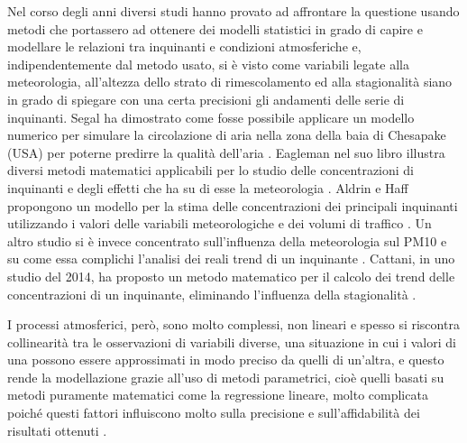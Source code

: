 \documentclass[a4paper]{report}
\begin{document}
Nel corso degli anni diversi studi hanno provato ad affrontare la questione usando metodi che portassero ad ottenere dei modelli statistici in grado di capire e modellare le relazioni tra inquinanti e condizioni atmosferiche e, indipendentemente dal metodo usato, si è visto come variabili legate alla meteorologia, all'altezza dello strato di rimescolamento ed alla stagionalità siano in grado di spiegare con una certa precisioni gli andamenti delle serie di inquinanti.  
Segal ha dimostrato come fosse possibile applicare un modello numerico per simulare la circolazione di aria nella zona della baia di Chesapake (USA) per poterne predirre la qualità dell'aria \cite{segal1982numerical}. Eagleman nel suo libro illustra diversi metodi matematici applicabili per lo studio delle concentrazioni di inquinanti e degli effetti che ha su di esse la meteorologia \cite{eagleman1991air}. Aldrin e Haff propongono un modello per la stima delle concentrazioni dei principali inquinanti utilizzando i valori delle variabili meteorologiche e dei volumi di traffico \cite{aldrin2005dependence}. Un altro studio si è invece concentrato sull'influenza della meteorologia sul PM10 e su come essa complichi l'analisi dei reali trend di un inquinante \cite{barmpadimos2011influence}. Cattani, in uno studio del 2014, ha proposto un metodo matematico per il calcolo dei trend delle concentrazioni di un inquinante, eliminando l'influenza della stagionalità \cite{cattani2014analisi}.

I processi atmosferici, però, sono molto complessi, non lineari e spesso si riscontra collinearità tra le osservazioni di variabili diverse, una situazione in cui i valori di una possono essere approssimati in modo preciso da quelli di un'altra, e questo rende la modellazione grazie all'uso di metodi parametrici, cioè quelli basati su metodi puramente matematici come la regressione lineare, molto complicata poiché questi fattori influiscono molto sulla precisione e sull'affidabilità dei risultati ottenuti \cite{gunst1975regression}. 
\end{document}
